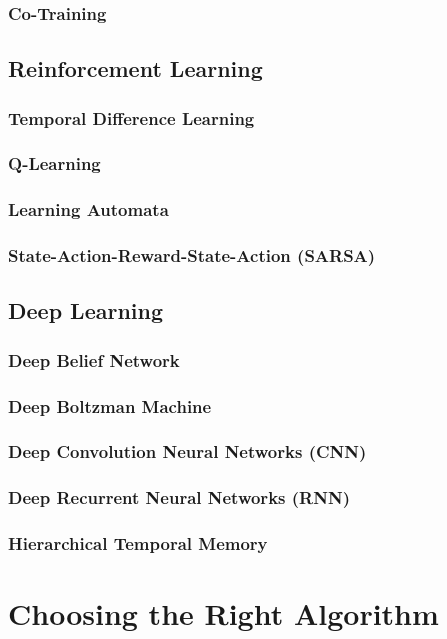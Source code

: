 \documentclass{report}
\begin{document}
	\subsection{Co-Training}

\section{Reinforcement Learning}

	\subsection{Temporal Difference Learning}

	\subsection{Q-Learning}

	\subsection{Learning Automata}

	\subsection{State-Action-Reward-State-Action (SARSA)}

\section{Deep Learning}

	\subsection{Deep Belief Network}

	\subsection{Deep Boltzman Machine}

	\subsection{Deep Convolution Neural Networks (CNN)}

	\subsection{Deep Recurrent Neural Networks (RNN)}

	\subsection{Hierarchical Temporal Memory}
	
\chapter{Choosing the Right Algorithm}

\begin{thebibliography}

\end{thebibliography}
\end{document}
